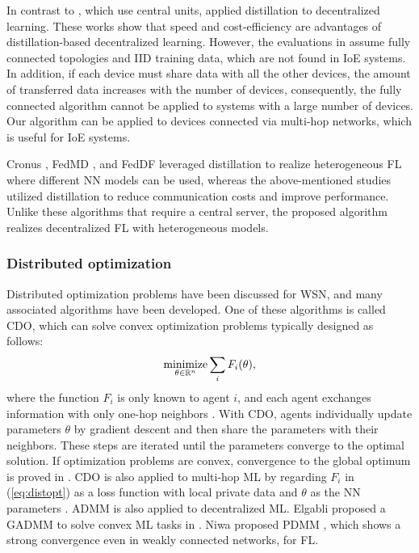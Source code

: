 \documentclass[journal]{IEEEtran}
\begin{document}
In contrast to \cite{oh2020mix2fld,ahn2019wireless,itahara2021distillation,chang2019cronus,jeong2018communication}, which use central units,
\cite{anil2018large,zhang2018deep} applied distillation to decentralized learning.
These works show that speed and cost-efficiency are advantages of distillation-based decentralized learning.
However, the evaluations in \cite{anil2018large,zhang2018deep} assume fully connected topologies and \gls{IID} training data,
which are not found in \gls{IoE} systems.
In addition, if each device must share data with all the other devices, the amount of transferred data increases with the number of devices,
consequently, the fully connected algorithm cannot be applied to systems with a large number of devices.
Our algorithm can be applied to devices connected via multi-hop networks, which is useful for \gls{IoE} systems.

Cronus \cite{chang2019cronus}, FedMD \cite{li2019fedmd}, and FedDF \cite{lin2020ensemble}
leveraged distillation to realize heterogeneous \gls{FL} where different \gls{NN} models can be used,
whereas the above-mentioned studies utilized distillation to reduce communication costs and improve performance.
Unlike these algorithms that require a central server,
the proposed algorithm realizes decentralized \gls{FL} with heterogeneous models.

\subsubsection*{Distributed optimization}
Distributed optimization problems have been discussed for \gls{WSN}, and many associated algorithms have been developed.
One of these algorithms is called \gls{CDO},
which can solve convex optimization problems typically designed as follows:
\begin{align}
  \operatorname*{minimize}_{\theta\in\mathbb{R}^n} \sum_i F_i(\theta), \label{eq:distopt}
\end{align}
where the function $F_i$ is only known to agent $i$, and each agent exchanges information with only one-hop neighbors \cite{nedic2009distributed,johansson2010randomized,colin2016gossip}.
With \gls{CDO}, agents individually update parameters $\theta$ by gradient descent and then share the parameters with their neighbors.
These steps are iterated until the parameters converge to the optimal solution.
If optimization problems are convex, convergence to the global optimum is proved in \cite{nedic2009distributed,johansson2010randomized,colin2016gossip}.
\gls{CDO} is also applied to multi-hop \gls{ML} by regarding $F_i$ in (\ref{eq:distopt}) as a loss function with local private data and $\theta$ as the \gls{NN} parameters
\cite{lalitha2019peer,savazzi2020federated,sato2020network}.
\Gls{ADMM} is also applied to decentralized \gls{ML}.
Elgabli \etal proposed a \gls{GADMM} to solve convex \gls{ML} tasks in \cite{elgabli2020gadmm}.
Niwa \etal proposed \gls{PDMM} \cite{niwa2020edge}, which shows a strong convergence even in weakly connected networks, for \gls{FL}.
\end{document}
